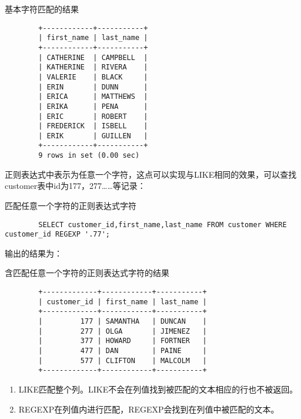 \documentclass[UTF8]{article}
\begin{document}
\begin{listing}[H]
	\caption{基本字符匹配的结果}
	\label{code:matchwordresult}
\begin{verbatim}
        +------------+-----------+
        | first_name | last_name |
        +------------+-----------+
        | CATHERINE  | CAMPBELL  |
        | KATHERINE  | RIVERA    |
        | VALERIE    | BLACK     |
        | ERIN       | DUNN      |
        | ERICA      | MATTHEWS  |
        | ERIKA      | PENA      |
        | ERIC       | ROBERT    |
        | FREDERICK  | ISBELL    |
        | ERIK       | GUILLEN   |
        +------------+-----------+
        9 rows in set (0.00 sec)
\end{verbatim}
\end{listing}

正则表达式中\.表示为任意一个字符，这点可以实现与LIKE相同的效果，可以查找customer表中id为177，277……等记录：

\begin{listing}[H]
	\caption{匹配任意一个字符的正则表达式字符}
	\label{code:matchonewordzhengze}
\begin{verbatim}
        SELECT customer_id,first_name,last_name FROM customer WHERE customer_id REGEXP '.77';
\end{verbatim}
\end{listing}

输出的结果为：

\begin{listing}[H]
	\caption{含匹配任意一个字符的正则表达式字符的结果}
	\label{code:matchonewordzhengzeresult}
\begin{verbatim}
        +-------------+------------+-----------+
        | customer_id | first_name | last_name |
        +-------------+------------+-----------+
        |         177 | SAMANTHA   | DUNCAN    |
        |         277 | OLGA       | JIMENEZ   |
        |         377 | HOWARD     | FORTNER   |
        |         477 | DAN        | PAINE     |
        |         577 | CLIFTON    | MALCOLM   |
        +-------------+------------+-----------+
\end{verbatim}
\end{listing}

\begin{orangebox}[frametitle={Tips 9.1.1 LIKE与RECEGP的区别}]
\begin{enumerate}
        \item LIKE匹配整个列。LIKE不会在列值找到被匹配的文本相应的行也不被返回。
        \item REGEXP在列值内进行匹配，REGEXP会找到在列值中被匹配的文本。
\end{enumerate}
\end{orangebox}
\end{document}
